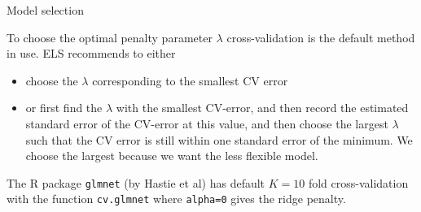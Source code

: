 \documentclass[
  ignorenonframetext,
]{beamer}
\providecommand{\tightlist}{%
  \setlength{\itemsep}{0pt}\setlength{\parskip}{0pt}}
\begin{document}
\begin{frame}[fragile]

\begin{block}{Model selection}

To choose the optimal penalty parameter \(\lambda\) cross-validation is
the default method in use. ELS recommends to either

\begin{itemize}
\tightlist
\item
  choose the \(\lambda\) corresponding to the smallest CV error
\item
  or first find the \(\lambda\) with the smallest CV-error, and then
  record the estimated standard error of the CV-error at this value, and
  then choose the largest \(\lambda\) such that the CV error is still
  within one standard error of the minimum. We choose the largest
  because we want the less flexible model.
\end{itemize}

The R package \texttt{glmnet} (by Hastie et al) has default \(K=10\)
fold cross-validation with the function \texttt{cv.glmnet} where
\texttt{alpha=0} gives the ridge penalty.

\end{block}

\end{frame}
\end{document}
